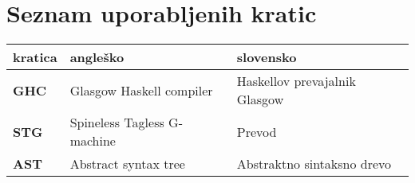 \chapter*{Seznam uporabljenih kratic}

\begin{tabular}{l|l|l}
  {\bf kratica} & {\bf angleško} & {\bf slovensko} \\ \hline
  {\bf GHC} & Glasgow Haskell compiler & Haskellov prevajalnik Glasgow \\
  {\bf STG} & Spineless Tagless G-machine & Prevod \\
  {\bf AST} & Abstract syntax tree & Abstraktno sintaksno drevo \\
\end{tabular}